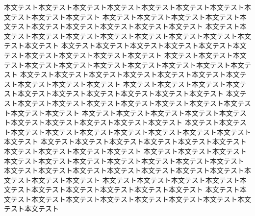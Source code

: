 \documentclass[uplatex,dvipdfmx,a4paper,twocolumn,base=11pt,jbase=11pt,ja=standard]{bxjsarticle}
\begin{document}
本文テスト本文テスト本文テスト本文テスト本文テスト本文テスト本文テスト本文テスト本文テスト本文テスト
本文テスト本文テスト本文テスト本文テスト本文テスト本文テスト本文テスト本文テスト本文テスト本文テスト
本文テスト本文テスト本文テスト本文テスト本文テスト本文テスト本文テスト本文テスト本文テスト本文テスト
本文テスト本文テスト本文テスト本文テスト本文テスト本文テスト本文テスト本文テスト本文テスト本文テスト
本文テスト本文テスト本文テスト本文テスト本文テスト本文テスト本文テスト本文テスト本文テスト本文テスト
本文テスト本文テスト本文テスト本文テスト本文テスト本文テスト本文テスト本文テスト本文テスト本文テスト
本文テスト本文テスト本文テスト本文テスト本文テスト本文テスト本文テスト本文テスト本文テスト本文テスト
本文テスト本文テスト本文テスト本文テスト本文テスト本文テスト本文テスト本文テスト本文テスト本文テスト
本文テスト本文テスト本文テスト本文テスト本文テスト本文テスト本文テスト本文テスト本文テスト本文テスト
本文テスト本文テスト本文テスト本文テスト本文テスト本文テスト本文テスト本文テスト本文テスト本文テスト
本文テスト本文テスト本文テスト本文テスト本文テスト本文テスト本文テスト本文テスト本文テスト本文テスト
本文テスト本文テスト本文テスト本文テスト本文テスト本文テスト本文テスト本文テスト本文テスト本文テスト
本文テスト本文テスト本文テスト本文テスト本文テスト本文テスト本文テスト本文テスト本文テスト本文テスト
本文テスト本文テスト本文テスト本文テスト本文テスト本文テスト本文テスト本文テスト本文テスト本文テスト
本文テスト本文テスト本文テスト本文テスト本文テスト本文テスト本文テスト本文テスト本文テスト本文テスト
\end{document}
